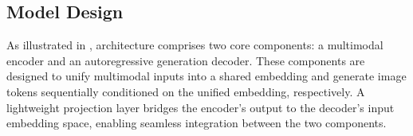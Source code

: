 




\subsection{Model Design}
\label{sec:model}
As illustrated in , \model architecture comprises two core components: a multimodal encoder and an autoregressive generation decoder. These components are designed to unify multimodal inputs into a shared embedding and generate image tokens sequentially conditioned on the unified embedding, respectively. 
A lightweight projection layer bridges the encoder's output to the decoder's input embedding space, enabling seamless integration between the two components.


